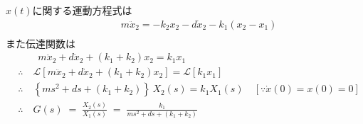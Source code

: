 \documentclass[a4paper,12pt]{article}
\begin{document}
\begin{tcolorbox}[title={6. (1)この図によって示されるシステムの運動方程式と伝達関数を求めよ。 
    }]

    \(x(t)\)に関する運動方程式は
    \begin{align*}
        &\qquad m\ddot{x}_2 =-k_2 x_2 - d \dot{x}_2 - k_1 \left(x_2 - x_1\right) \\
    \end{align*}
    また伝達関数は
    \begin{align*}
        &\qquad m\ddot{x}_2 +  d \dot{x}_2 + \left(k_1+k_2\right) x_2
        = k_1 x_1 \\
        &\therefore \quad \mathcal{L} \left[ m\ddot{x}_2 +  d \dot{x}_2 + \left(k_1+k_2\right) x_2\right] 
        =\mathcal{L} \left[ k_1 x_1 \right] \\
        &\therefore \quad \left\{m s^2 + d s + \left(k_1+k_2\right) \right\}\,X_2(s) = k_1 X_1(s) \quad [\because \dot{x}(0)=x(0)=0 ]\\
        &\therefore \quad G(s) \;=\;\frac{X_2(s)}{X_1(s)}
        \;=\;\frac{k_1}{m s^2 + d s + \left(k_1 + k_2\right)}
    \end{align*}

\end{tcolorbox}
\end{document}
